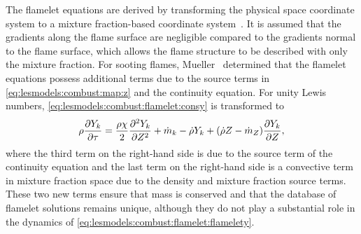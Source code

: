 The flamelet equations are derived by transforming the physical space coordinate system to a mixture fraction-based coordinate system~\cite{peters1984}. It is assumed that the gradients along the flame surface are negligible compared to the gradients normal to the flame surface, which allows the flame structure to be described with only the mixture fraction. For sooting flames, Mueller~\cite{muellerphd} determined that the flamelet equations possess additional terms due to the source terms in \cref{eq:lesmodels:combust:map:z} and the continuity equation. For unity Lewis numbers, \cref{eq:lesmodels:combust:flamelet:consy} is transformed to
\begin{equation}\label{eq:lesmodels:combust:flamelet:flamelety}
  \rho\pder[Y_k]{\tau} = \frac{\rho\chi}{2}\sder[Y_k]{Z} + \dot{m}_k - \dot{\rho}Y_k + (\dot{\rho}Z - \dot{m}_Z)\pder[Y_k]{Z},
\end{equation}
where the third term on the right-hand side is due to the source term of the continuity equation and the last term on the right-hand side is a convective term in mixture fraction space due to the density and mixture fraction source terms. These two new terms ensure that mass is conserved and that the database of flamelet solutions remains unique, although they do not play a substantial role in the dynamics of \cref{eq:lesmodels:combust:flamelet:flamelety}.

